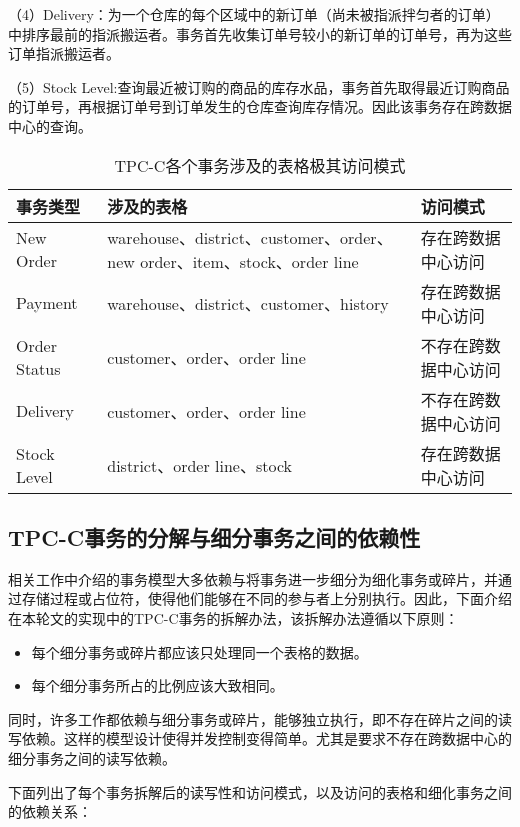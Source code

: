 （4）Delivery：为一个仓库的每个区域中的新订单（尚未被指派拌匀者的订单）中排序最前的指派搬运者。事务首先收集订单号较小的新订单的订单号，再为这些订单指派搬运者。

（5）Stock Level:查询最近被订购的商品的库存水品，事务首先取得最近订购商品的订单号，再根据订单号到订单发生的仓库查询库存情况。因此该事务存在跨数据中心的查询。
\\
\begin{table}[htb]
  \centering\small
  \caption{TPC-C各个事务涉及的表格极其访问模式}
  \label{tab:exampletable}
  \begin{tabular}{p{90pt}p{160pt}p{130pt}}
    \toprule
    事务类型   & 涉及的表格 & 访问模式 \\
    \midrule
    New Order & warehouse、district、customer、order、new order、item、stock、order line  & 存在跨数据中心访问 \\
    Payment & warehouse、district、customer、history & 存在跨数据中心访问  \\
    Order Status &  customer、order、order line & 不存在跨数据中心访问    \\
    Delivery & customer、order、order line & 不存在跨数据中心访问  \\
    Stock Level & district、order line、stock & 存在跨数据中心访问\\
    \bottomrule
  \end{tabular}
\end{table}

\subsection{TPC-C事务的分解与细分事务之间的依赖性}

相关工作中介绍的事务模型大多依赖与将事务进一步细分为细化事务或碎片，并通过存储过程或占位符，使得他们能够在不同的参与者上分别执行。因此，下面介绍在本轮文的实现中的TPC-C事务的拆解办法，该拆解办法遵循以下原则：

\begin{itemize}
\item 每个细分事务或碎片都应该只处理同一个表格的数据。
\item 每个细分事务所占的比例应该大致相同。
\end{itemize}

同时，许多工作都依赖与细分事务或碎片，能够独立执行，即不存在碎片之间的读写依赖。这样的模型设计使得并发控制变得简单。尤其是要求不存在跨数据中心的细分事务之间的读写依赖。

下面列出了每个事务拆解后的读写性和访问模式，以及访问的表格和细化事务之间的依赖关系：


